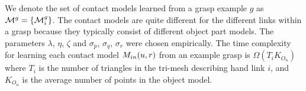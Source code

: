 We denote the set of contact models learned from a grasp example $g$ as $\mathcal{M}^g=\{\mathcal{M}^g_i\}$. The contact models are quite different for the different links within a grasp because they typically consist of different object part models. The parameters $\lambda$, $\eta$, $\zeta$ and $\sigma_{p}$, $\sigma_{q}$, $\sigma_{r}$ were chosen empirically. The time complexity for learning each contact model $M_{in}(u, r)$ from an example grasp is $\Omega(T_i K_{O_n})$ where $T_i$ is the number of triangles in the tri-mesh describing hand link $i$, and $K_{O_n}$ is the average number of points in the object model.


%
%
